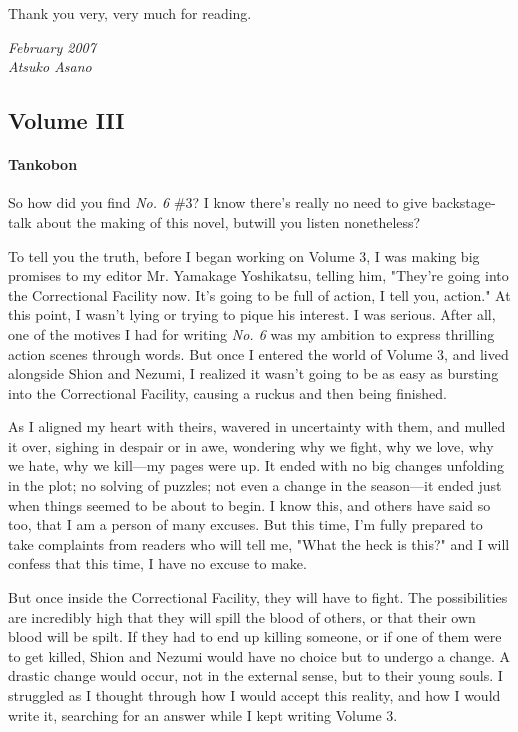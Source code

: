 Thank you very, very much for reading.

\myspace

\emph{February 2007\\
Atsuko Asano}

\subsection{Volume III}
\paragraph{Tankobon}

So how did you find \emph{No. 6} \#3? I know there's really no need to give
backstage-talk about the making of this novel, but\el will you listen
nonetheless?

To tell you the truth, before I began working on Volume 3, I was making
big promises to my editor Mr. Yamakage Yoshikatsu, telling him, "They're
going into the Correctional Facility now. It's going to be full of
action, I tell you, action." At this point, I wasn't lying or trying to
pique his interest. I was serious. After all, one of the motives I had
for writing \emph{No. 6} was my ambition to express thrilling action scenes
through words. But once I entered the world of Volume 3, and lived
alongside Shion and Nezumi, I realized it wasn't going to be as easy as
bursting into the Correctional Facility, causing a ruckus and then being
finished.

As I aligned my heart with theirs, wavered in uncertainty with them, and
mulled it over, sighing in despair or in awe, wondering why we fight,
why we love, why we hate, why we kill---my pages were up. It ended with no
big changes unfolding in the plot; no solving of puzzles; not even a
change in the season---it ended just when things seemed to be about to
begin. I know this, and others have said so too, that I am a person of
many excuses. But this time, I'm fully prepared to take complaints from
readers who will tell me, "What the heck is this?" and I will confess
that this time, I have no excuse to make.

But once inside the Correctional Facility, they will have to fight. The
possibilities are incredibly high that they will spill the blood of
others, or that their own blood will be spilt. If they had to end up
killing someone, or if one of them were to get killed, Shion and Nezumi
would have no choice but to undergo a change. A drastic change would
occur, not in the external sense, but to their young souls. I struggled
as I thought through how I would accept this reality, and how I would
write it, searching for an answer while I kept writing Volume 3.

